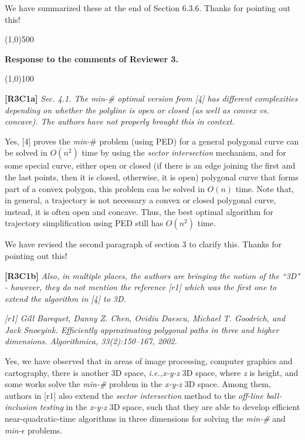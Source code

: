 \documentclass{letter}
\newcommand{\ie}{\emph{i.e.,}\xspace}
\begin{document}
{We have summarized these at the end of Section 6.3.6. Thanks for pointing out this!


\line(1,0){500}

\textbf{Response to the comments of Reviewer 3.}

\line(1,0){100}

\textbf{[R3C1a]} \emph{
Sec. 4.1. The min-\# optimal version from [4] has different complexities depending on whether the polyline is open or closed (as well as convex vs. concave). The authors have not properly brought this in context.}

Yes, [4] proves the \emph{min-$\#$} problem (using PED) for a general polygonal curve can be solved in $O(n^2)$ time by using the \textit{sector intersection} mechanism, and for some special curve, either open or closed (if there is an edge joining the first and the last points, then it is closed, otherwise, it is open) polygonal curve that forms part of a convex polygon, this problem can be solved in $O(n)$ time. Note that, in general, a trajectory is not necessary a convex or closed polygonal curve, instead, it is often open and concave. Thus, the best optimal algorithm for trajectory simplification using PED still has $O(n^2)$ time.} 

We have revised the second paragraph of section 3 to clarify this. Thanks for pointing out this!

\textbf{[R3C1b]} \emph{Also, in multiple places, the authors are bringing the notion of the ``3D" - however, they do not mention the reference [r1] which was the first one to extend the algorithm in [4] to 3D. }

\emph{[r1] Gill Barequet, Danny Z. Chen, Ovidiu Daescu, Michael T. Goodrich, and Jack Snoeyink. Efficiently approximating polygonal paths in three and higher dimensions. Algorithmica, 33(2):150–167, 2002.}

Yes, we have observed that in areas of image processing, computer graphics and cartography, there is another 3D space, \ie \emph{x-y-z} 3D space, where {\em z} is height, and some works solve the \emph{min-\#} problem in the \emph{x-y-z} 3D space. Among them, authors in [r1] also extend the \textit{sector intersection} method to the \textit{off-line ball-inclusion testing} in the \emph{x-y-z} 3D space, such that they are able to develop efficient near-quadratic-time algorithms in three dimensions for solving the \emph{min-\#} and \emph{min-$\epsilon$} problems. %
\end{document}
